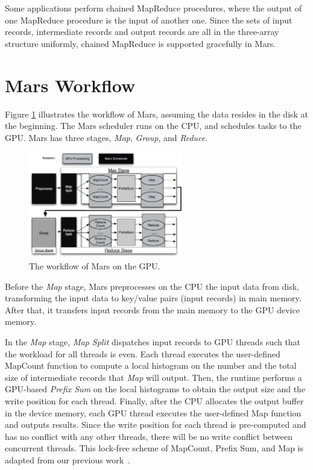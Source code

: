 Some applications perform chained MapReduce procedures,
where the output of one MapReduce procedure is the input of
another one. Since the sets of
input records, intermediate records and output records  are all
in the three-array structure uniformly, chained MapReduce is
supported gracefully in Mars.

\section{Mars Workflow}
Figure \ref{fig:MarsWorkflow} illustrates the workflow of Mars, assuming the data resides in the disk at the beginning.
The Mars scheduler runs on the CPU, and schedules tasks to the GPU.
Mars has three stages, {\em Map}, {\em Group}, and {\em Reduce}.

\begin{figure}[ht]
  \centering
  \includegraphics[width=0.60\textwidth]{figure/Mars_workflow.eps}
  \caption{The workflow of Mars on the GPU. }\label{fig:MarsWorkflow}
\end{figure}

Before the {\em Map} stage, Mars preprocesses on the CPU the input data from disk,
transforming the input data to key/value pairs (input records) in main memory.
After that, it transfers input records from the main memory to the GPU device memory.

In the {\em Map} stage, {\em Map Split} dispatches
input records to GPU threads such that the workload for all threads is even.
Each thread executes the user-defined MapCount function to compute a local histogram on
the number and the total size of intermediate records that {\em Map} will output.
Then, the runtime performs a GPU-based {\em Prefix Sum} on the local histograms to
obtain the output size and the write position for each thread.
Finally, after the CPU allocates the output buffer in the device memory, each GPU
thread executes the user-defined Map function and outputs results.  Since the write
position for each thread is pre-computed and has no conflict with any other threads,
there will be no write conflict between concurrent threads. This lock-free scheme of MapCount,
Prefix Sum, and Map is adapted from our previous
work~\cite{He2008a}.

